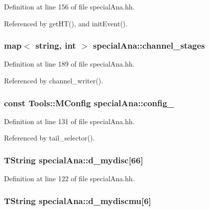 Definition at line 156 of file special\-Ana.\-hh.



Referenced by get\-H\-T(), and init\-Event().

\subsubsection[{channel\-\_\-stages}]{\setlength{\rightskip}{0pt plus 5cm}map$<$ string, int $>$ special\-Ana\-::channel\-\_\-stages}\label{classspecialAna_a58cbc80a0bb41446344e4d9170450974}


Definition at line 189 of file special\-Ana.\-hh.



Referenced by channel\-\_\-writer().

\subsubsection[{config\-\_\-}]{\setlength{\rightskip}{0pt plus 5cm}const Tools\-::\-M\-Config special\-Ana\-::config\-\_\-}\label{classspecialAna_a1e76bd61bb4a97d99729f398674e14e2}


Definition at line 131 of file special\-Ana.\-hh.



Referenced by tail\-\_\-selector().

\subsubsection[{d\-\_\-mydisc}]{\setlength{\rightskip}{0pt plus 5cm}T\-String special\-Ana\-::d\-\_\-mydisc\mbox{[}66\mbox{]}}\label{classspecialAna_a6b83298c41f32cdbd7979ec8033eefd6}


Definition at line 122 of file special\-Ana.\-hh.

\subsubsection[{d\-\_\-mydiscmu}]{\setlength{\rightskip}{0pt plus 5cm}T\-String special\-Ana\-::d\-\_\-mydiscmu\mbox{[}6\mbox{]}}\label{classspecialAna_a8bd00db3975c79baf92da5f720cca2fc}


